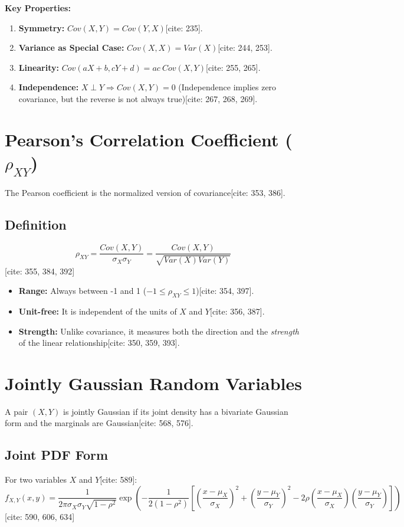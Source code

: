 \documentclass[11pt]{article}
\begin{document}
\textbf{Key Properties:}
\begin{enumerate}
    \item \textbf{Symmetry:} $Cov(X,Y) = Cov(Y,X)$[cite: 235].
    \item \textbf{Variance as Special Case:} $Cov(X,X) = Var(X)$[cite: 244, 253].
    \item \textbf{Linearity:} $Cov(aX+b, cY+d) = ac \ Cov(X,Y)$[cite: 255, 265].
    \item \textbf{Independence:} $X \perp Y \Rightarrow Cov(X,Y) = 0$ (Independence implies zero covariance, but the reverse is not always true)[cite: 267, 268, 269].
\end{enumerate}

\section{Pearson's Correlation Coefficient ($\rho_{XY}$)}
The Pearson coefficient is the normalized version of covariance[cite: 353, 386].

\subsection{Definition}
$$\rho_{XY} = \frac{Cov(X,Y)}{\sigma_{X}\sigma_{Y}} = \frac{Cov(X,Y)}{\sqrt{Var(X)Var(Y)}}$$ [cite: 355, 384, 392]
\begin{itemize}
    \item \textbf{Range:} Always between -1 and 1 ($-1 \le \rho_{XY} \le 1$)[cite: 354, 397].
    \item \textbf{Unit-free:} It is independent of the units of $X$ and $Y$[cite: 356, 387].
    \item \textbf{Strength:} Unlike covariance, it measures both the direction and the \textit{strength} of the linear relationship[cite: 350, 359, 393].
\end{itemize}

\section{Jointly Gaussian Random Variables}
A pair $(X, Y)$ is jointly Gaussian if its joint density has a bivariate Gaussian form and the marginals are Gaussian[cite: 568, 576].

\subsection{Joint PDF Form}
For two variables $X$ and $Y$[cite: 589]:
$$f_{X,Y}(x,y) = \frac{1}{2\pi\sigma_{X}\sigma_{Y}\sqrt{1-\rho^{2}}} \exp\left(-\frac{1}{2(1-\rho^{2})} \left[ \left(\frac{x-\mu_{X}}{\sigma_{X}}\right)^2 + \left(\frac{y-\mu_{Y}}{\sigma_{Y}}\right)^2 - 2\rho\left(\frac{x-\mu_{X}}{\sigma_{X}}\right)\left(\frac{y-\mu_{Y}}{\sigma_{Y}}\right) \right]\right)$$ [cite: 590, 606, 634]
\end{document}
